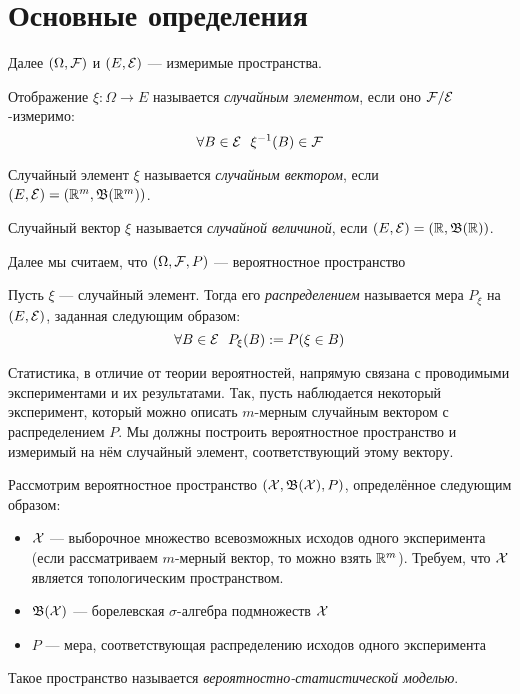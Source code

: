 \section{Основные определения}

\begin{note}
	Далее $(\Omega, \mathcal{F})$ и $(E, \mathcal{E})$ --- измеримые пространства.
\end{note}

\begin{definition}
	Отображение $\xi \colon \Omega \to E$ называется \textit{случайным элементом}, если оно $\mathcal{F}/\mathcal{E}$-измеримо:
	\[
		\forall B \in \mathcal{E}\ \ \xi^{-1}(B) \in \mathcal{F}
	\]
\end{definition}

\begin{definition}
	Случайный элемент $\xi$ называется \textit{случайным вектором}, если $(E, \mathcal{E}) = (\mathbb{R}^m, \mathfrak{B}(\mathbb{R}^m))$.
\end{definition}

\begin{definition}
	Случайный вектор $\xi$ называется \textit{случайной величиной}, если $(E, \mathcal{E}) = (\mathbb{R}, \mathfrak{B}(\mathbb{R}))$.
\end{definition}

\begin{note}
	Далее мы считаем, что $(\Omega, \mathcal{F}, P)$ --- вероятностное пространство
\end{note}

\begin{definition}
	Пусть $\xi$ --- случайный элемент. Тогда его \textit{распределением} называется мера $P_\xi$ на $(E, \mathcal{E})$, заданная следующим образом:
	\[
		\forall B \in \mathcal{E}\ \ P_\xi(B) := P(\xi \in B)
	\]
\end{definition}

\begin{note}
	Статистика, в отличие от теории вероятностей, напрямую связана с проводимыми экспериментами и их результатами. Так, пусть наблюдается некоторый эксперимент, который можно описать $m$-мерным случайным вектором с распределением $P$. Мы должны построить вероятностное пространство и измеримый на нём случайный элемент, соответствующий этому вектору. 
\end{note}

\begin{definition}
	Рассмотрим вероятностное пространство $(\mathcal{X}, \mathfrak{B}(\mathcal{X}), P)$, определённое следующим образом:
	\begin{itemize}
		\item $\mathcal{X}$ --- выборочное множество всевозможных исходов одного эксперимента (если рассматриваем $m$-мерный вектор, то можно взять $\mathbb{R}^m$). Требуем, что $\mathcal{X}$ является топологическим пространством.
		
		\item $\mathfrak{B}(\mathcal{X})$ --- борелевская $\sigma$-алгебра подмножеств $\mathcal{X}$
		
		\item $P$ --- мера, соответствующая распределению исходов одного эксперимента
	\end{itemize}
	Такое пространство называется \textit{вероятностно-статистической моделью}.
\end{definition}

